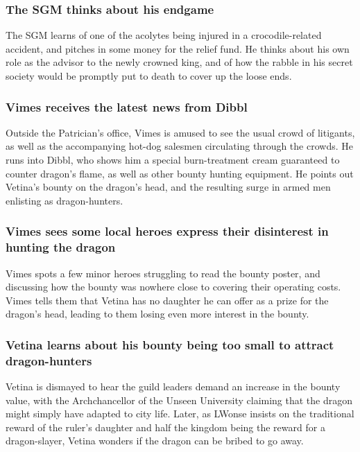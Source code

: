 \subsubsection{The \Gls{SGM} thinks about his endgame}
The \Gls{SGM} learns of one of the acolytes being injured in a crocodile-related accident, and
pitches in some money for the relief fund. He thinks about his own role as the advisor to the newly
crowned king, and of how the rabble in his secret society would be promptly put to death to cover up
the loose ends.

\subsubsection{\Gls{Vimes} receives the latest news from \Gls{Dibbl}}
Outside the Patrician's office, \Gls{Vimes} is amused to see the usual crowd of litigants, as well
as the accompanying hot-dog salesmen circulating through the crowds. He runs into \Gls{Dibbl}, who
shows him a special burn-treatment cream guaranteed to counter dragon's flame, as well as other
bounty hunting equipment. He points out \Gls{Vetina}'s bounty on the dragon's head, and the
resulting surge in armed men enlisting as dragon-hunters.

\subsubsection{\Gls{Vimes} sees some local heroes express their disinterest in hunting the dragon}
\Gls{Vimes} spots a few minor heroes struggling to read the bounty poster, and discussing how the
bounty was nowhere close to covering their operating costs. \Gls{Vimes} tells them that \Gls{Vetina}
has no daughter he can offer as a prize for the dragon's head, leading to them losing even more
interest in the bounty.

\subsubsection{\Gls{Vetina} learns about his bounty being too small to attract dragon-hunters}
\Gls{Vetina} is dismayed to hear the guild leaders demand an  increase in the bounty value, with the
Archchancellor of the Unseen University claiming that the dragon might simply have adapted to city
life. Later, as \Gls{LWonse} insists on the traditional reward of the ruler's daughter and half the
kingdom being the reward for a dragon-slayer, \Gls{Vetina} wonders if the dragon can be bribed to
go away.

